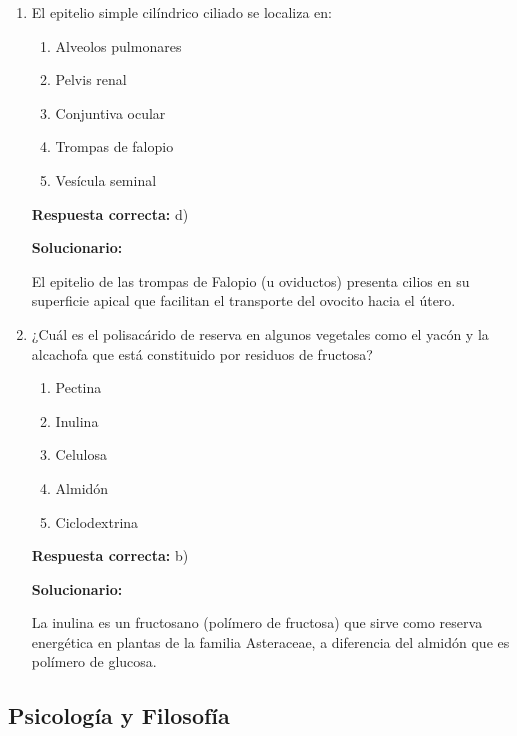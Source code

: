 \begin{enumerate}[resume]
	\item El epitelio simple cilíndrico ciliado se localiza en:
	\begin{enumerate}[label=\alph*)]
		\item Alveolos pulmonares
		\item Pelvis renal
		\item Conjuntiva ocular
		\item Trompas de falopio
		\item Vesícula seminal
	\end{enumerate}
	\textbf{Respuesta correcta:} d)

	\vspace{2mm}
	\textbf{Solucionario:}

	El epitelio de las trompas de Falopio (u oviductos) presenta cilios en su superficie apical que facilitan el transporte del ovocito hacia el útero.


	\vspace{6mm}

	\item ¿Cuál es el polisacárido de reserva en algunos vegetales como el yacón y la alcachofa que está constituido por residuos de fructosa?
	\begin{enumerate}[label=\alph*)]
		\item Pectina
		\item Inulina
		\item Celulosa
		\item Almidón
		\item Ciclodextrina
	\end{enumerate}
	\textbf{Respuesta correcta:} b)

	\vspace{2mm}
	\textbf{Solucionario:}

	La inulina es un fructosano (polímero de fructosa) que sirve como reserva energética en plantas de la familia Asteraceae, a diferencia del almidón que es polímero de glucosa.


	\vspace{6mm}
\end{enumerate}

\subsection*{Psicología y Filosofía}

